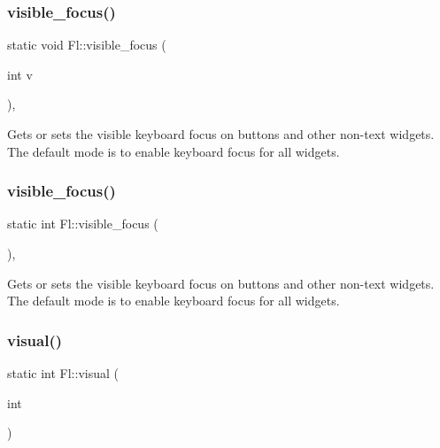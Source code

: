 \mbox{\label{class_fl_ade5fd097d36257dce2b7aff1165e037f}} 
\subsubsection{\texorpdfstring{visible\+\_\+focus()}{visible\_focus()}\hspace{0.1cm}{\footnotesize\ttfamily [1/2]}}
{\footnotesize\ttfamily static void Fl\+::visible\+\_\+focus (\begin{DoxyParamCaption}\item[{int}]{v }\end{DoxyParamCaption})\hspace{0.3cm}{\ttfamily [inline]}, {\ttfamily [static]}}

Gets or sets the visible keyboard focus on buttons and other non-\/text widgets. The default mode is to enable keyboard focus for all widgets. \mbox{\label{class_fl_ae9eaddd02a0aa637078ee2dd80b85b2f}} 
\subsubsection{\texorpdfstring{visible\+\_\+focus()}{visible\_focus()}\hspace{0.1cm}{\footnotesize\ttfamily [2/2]}}
{\footnotesize\ttfamily static int Fl\+::visible\+\_\+focus (\begin{DoxyParamCaption}{ }\end{DoxyParamCaption})\hspace{0.3cm}{\ttfamily [inline]}, {\ttfamily [static]}}

Gets or sets the visible keyboard focus on buttons and other non-\/text widgets. The default mode is to enable keyboard focus for all widgets. \mbox{\label{class_fl_a96065665bab374bab4dc61bacccb40d8}} 
\subsubsection{\texorpdfstring{visual()}{visual()}}
{\footnotesize\ttfamily static int Fl\+::visual (\begin{DoxyParamCaption}\item[{int}]{ }\end{DoxyParamCaption})\hspace{0.3cm}{\ttfamily [static]}}


